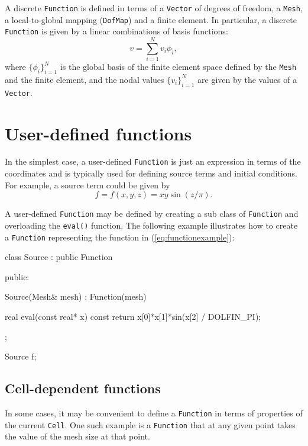A discrete \texttt{Function} is defined in terms of a
\texttt{Vector} of degrees of freedom, a \texttt{Mesh}, a
local-to-global mapping (\texttt{DofMap}) and a finite element.  In
particular, a discrete \texttt{Function} is given by a linear
combinations of basis functions:
\begin{equation}
  v = \sum_{i=1}^{N} v_i \phi_{i},
\end{equation}
where $\{\phi_i\}_{i=1}^N$ is the global basis of the finite element
space defined by the \texttt{Mesh} and the finite element, and
the nodal values $\{v_i\}_{i=1}^N$ are given by the values of a
\texttt{Vector}.

\section{User-defined functions}

In the simplest case, a user-defined \texttt{Function} is just an
expression in terms of the coordinates and is typically used for
defining source terms and initial conditions. For example, a source
term could be given by
\begin{equation} \label{eq:functionexample}
  f = f(x, y, z) = xy \sin(z / \pi).
\end{equation}

A user-defined \texttt{Function} may be defined by creating a sub
class of \texttt{Function} and overloading the \texttt{eval()}
function.  The following example illustrates how to create a
\texttt{Function} representing the function in
(\ref{eq:functionexample}):
\begin{code}
class Source : public Function
{
public:
    
  Source(Mesh& mesh) : Function(mesh) {}

  real eval(const real* x) const
  {
    return x[0]*x[1]*sin(x[2] / DOLFIN_PI);
  }

};

Source f;
\end{code}


\subsection{Cell-dependent functions}

In some cases, it may be convenient to define a \texttt{Function} in
terms of properties of the current \texttt{Cell}. One such example is
a \texttt{Function} that at any given point takes the value of the
mesh size at that point.

